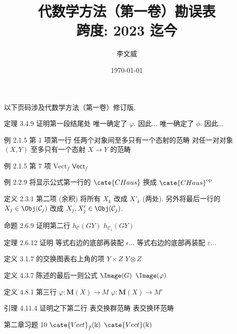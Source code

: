\documentclass{AJerrata}
\title{\bfseries 代数学方法（第一卷）勘误表 \\ 跨度: 2023 迄今 }
\author{李文威}
\date{\today}
\begin{document}
	\maketitle
	以下页码涉及代数学方法（第一卷）修订版.

	\begin{Errata}
		\item[定理 3.4.9 证明第一段结尾处]
		\Orig 唯一确定了 $\varphi$. 因此...
		\Corr 唯一确定了 $\phi$. 因此...
		
		\item[例 2.1.5 第 1 项第一行]
		\Orig 任两个对象间至多只有一个态射的范畴
		\Corr 对任一对对象 $(X, Y)$ 至多只有一个态射 $X \to Y$ 的范畴
		
		\item[例 2.1.5 第 7 项]
		\Orig $\mathrm{Vect}_f$
		\Corr $\mathsf{Vect}_f$
		
		\item[例 2.2.9]
		将显示公式第一行的 $\cate{CHaus}$ 换成 $\cate{CHaus}^{\text{op}}$
		
		\item[定义 2.3.1 第二项 (余积)]
		将所有 $X_k$ 改成 $X'_k$ (两处). 另外将最后一行的 $X_j \in \Obj(\mathcal{C}_j)$ 改成 $X_j, X'_j \in \Obj(\mathcal{C}_j)$.
		
		\item[命题 2.6.9 证明第二行]
		\Orig $h_{\mathcal{C}}(GY)$
		\Corr $h_{\mathcal{C}_1}(GY)$
		
		\item[定理 2.6.12 证明]
		\Orig 等式右边的底部再装配 $\epsilon$...
		\Corr 等式右边的底部再装配 $\varepsilon$...
		
		\item[定义 3.1.7 的交换图表右上角的项]
		\Orig $Y \times Z$
		\Corr $Y \otimes Z$
		
		\item[定义 4.3.7 陈述的最后一则公式]
		\Orig $\Image(G)$
		\Corr $\Image(\varphi)$
		
		\item[定义 4.8.1 第三行]
		\Orig $\varphi: \mathbf{M}(X) \to M$
		\Corr $\varphi: \mathbf{M}(X) \to M'$
		
		\item[引理 4.11.4 证明之下第二行]
		\Orig 表交换群范畴
		\Corr 表交换环范畴
		
		\item[第二章习题 10]
		\Orig $\cate{Vect}_f(\Bbbk)$
		\Corr $\cate{Vect}(\Bbbk)$
		

\end{Errata}
\end{document}
